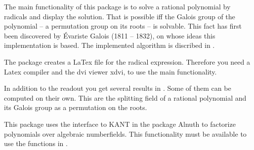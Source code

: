 

The main functionality of this package is to solve a rational polynomial by
radicals and display the solution. That is possible iff the Galois group of
the polynomial -- a permutation group on its roots -- is solvable. This fact
has first been discovered by \'Evariste Galois (1811 -- 1832), on whose ideas
this implementation is based. The implemented algorithm is discribed in
\cite{Distler05}.

The package creates a LaTex file for the radical expression. Therefore you
need a Latex compiler and the dvi viewer xdvi, to use the main
functionality.  

In addition to the readout you get several results in {\GAP}. Some of them can
be computed on their own. This are the splitting field of a rational polynomial
and its Galois group as a permutation on the roots.

This package uses the interface to KANT \cite{KANT} in the package Alnuth to
factorize polynomials over algebraic numberfields. This functionality must
be available to use the functions in {\Radiroot}.  


